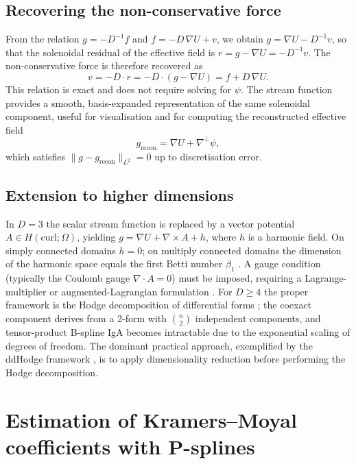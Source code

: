 \documentclass[11pt,a4paper]{article}
\newcommand{\grad}{\nabla}
\newcommand{\Div}{\nabla\!\cdot\!}
\newcommand{\curl}{\nabla\!\times\!}
\newcommand{\perpgrad}{\nabla^{\!\perp}}
\newcommand{\norm}[1]{\lVert #1 \rVert}
\begin{document}
\subsection{Recovering the non-conservative force}

From the relation $g = -D^{-1} f$ and $f = -D\,\grad U + v$, we obtain
$g = \grad U - D^{-1} v$, so that the solenoidal residual of the effective
field is $r = g - \grad U = -D^{-1} v$. The non-conservative force is therefore
recovered as
\begin{equation}
v = -D \cdot r = -D \cdot (g - \grad U) = f + D\,\grad U .
\label{eq:v_recovery}
\end{equation}
This relation is exact and does not require solving for $\psi$. The stream
function provides a smooth, basis-expanded representation of the same
solenoidal component, useful for visualisation and for computing the
reconstructed effective field
\begin{equation}
g_{\mathrm{recon}} = \grad U + \perpgrad \psi,
\end{equation}
which satisfies $\norm{g - g_{\mathrm{recon}}}_{L^2} = 0$ up to discretisation
error.

\subsection{Extension to higher dimensions}

In $D = 3$ the scalar stream function is replaced by a vector potential
$A \in H(\mathrm{curl};\Omega)$, yielding $g = \grad U + \curl A + h$, where
$h$ is a harmonic field. On simply connected domains $h = 0$; on multiply
connected domains the dimension of the harmonic space equals the first Betti
number $\beta_1$ \cite{huang2016}. A gauge condition (typically the Coulomb
gauge $\Div A = 0$) must be imposed, requiring a Lagrange-multiplier or
augmented-Lagrangian formulation \cite{wang2016}. For $D \ge 4$ the proper
framework is the Hodge decomposition of differential forms
\cite{hirani2003,desbrun2005}; the coexact component derives from a 2-form with
$\binom{n}{2}$ independent components, and tensor-product B-spline IgA becomes
intractable due to the exponential scaling of degrees of freedom. The dominant
practical approach, exemplified by the ddHodge framework \cite{ddhodge2025}, is
to apply dimensionality reduction before performing the Hodge decomposition.

\section{Estimation of Kramers--Moyal coefficients with P-splines}
\label{sec:psplines}
\end{document}
